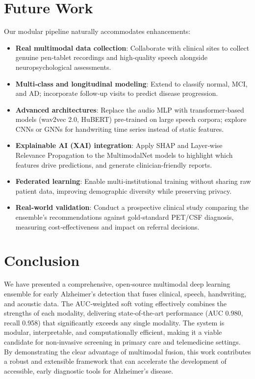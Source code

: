 \documentclass[conference]{IEEEtran}
\begin{document}
\section{Future Work}
Our modular pipeline naturally accommodates enhancements:
\begin{itemize}
  \item \textbf{Real multimodal data collection}: Collaborate with clinical sites to collect genuine pen‑tablet recordings and high‑quality speech alongside neuropsychological assessments.
  \item \textbf{Multi‑class and longitudinal modeling}: Extend to classify normal, MCI, and AD; incorporate follow‑up visits to predict disease progression.
  \item \textbf{Advanced architectures}: Replace the audio MLP with transformer‑based models (wav2vec 2.0, HuBERT) pre‑trained on large speech corpora; explore CNNs or GNNs for handwriting time series instead of static features.
  \item \textbf{Explainable AI (XAI) integration}: Apply SHAP and Layer‑wise Relevance Propagation to the MultimodalNet models to highlight which features drive predictions, and generate clinician‑friendly reports.
  \item \textbf{Federated learning}: Enable multi‑institutional training without sharing raw patient data, improving demographic diversity while preserving privacy.
  \item \textbf{Real‑world validation}: Conduct a prospective clinical study comparing the ensemble's recommendations against gold‑standard PET/CSF diagnosis, measuring cost‑effectiveness and impact on referral decisions.
\end{itemize}

\section{Conclusion}
We have presented a comprehensive, open‑source multimodal deep learning ensemble for early Alzheimer's detection that fuses clinical, speech, handwriting, and acoustic data. The AUC‑weighted soft voting effectively combines the strengths of each modality, delivering state‑of‑the‑art performance (AUC 0.980, recall 0.958) that significantly exceeds any single modality. The system is modular, interpretable, and computationally efficient, making it a viable candidate for non‑invasive screening in primary care and telemedicine settings. By demonstrating the clear advantage of multimodal fusion, this work contributes a robust and extensible framework that can accelerate the development of accessible, early diagnostic tools for Alzheimer's disease.
\end{document}
